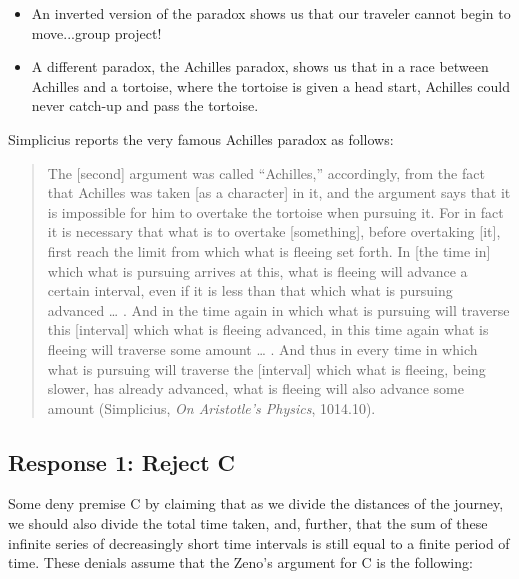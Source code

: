 \documentclass[oneside]{article}
\begin{document}
\begin{itemize}
\item
  An inverted version of the paradox shows us that our traveler cannot
  begin to move...group project!
\item
  A different paradox, the Achilles paradox, shows us that in a race
  between Achilles and a tortoise, where the tortoise is given a head
  start, Achilles could never catch-up and pass the tortoise.
\end{itemize}
Simplicius reports the very famous Achilles paradox as follows: 
\begin{quote}
The {[}second{]} argument was called ``Achilles,'' accordingly, from the
fact that Achilles was taken {[}as a character{]} in it, and the
argument says that it is impossible for him to overtake the tortoise
when pursuing it. For in fact it is necessary that what is to overtake
{[}something{]}, before overtaking {[}it{]}, first reach the limit from
which what is fleeing set forth. In {[}the time in{]} which what is
pursuing arrives at this, what is fleeing will advance a certain
interval, even if it is less than that which what is pursuing advanced
\ldots{} . And in the time again in which what is pursuing will traverse
this {[}interval{]} which what is fleeing advanced, in this time again
what is fleeing will traverse some amount \ldots{} . And thus in every
time in which what is pursuing will traverse the {[}interval{]} which
what is fleeing, being slower, has already advanced, what is fleeing
will also advance some amount (Simplicius, \emph{On Aristotle's Physics},
1014.10).
\end{quote}

\subsection*{Response 1: Reject C}\label{response-1-reject-c}

Some deny premise C by claiming that as we divide the distances of the
journey, we should also divide the total time taken, and, further, that
the sum of these infinite series of decreasingly short time intervals is
still equal to a finite period of time. These denials assume that the
Zeno's argument for C is the following:
\end{document}
